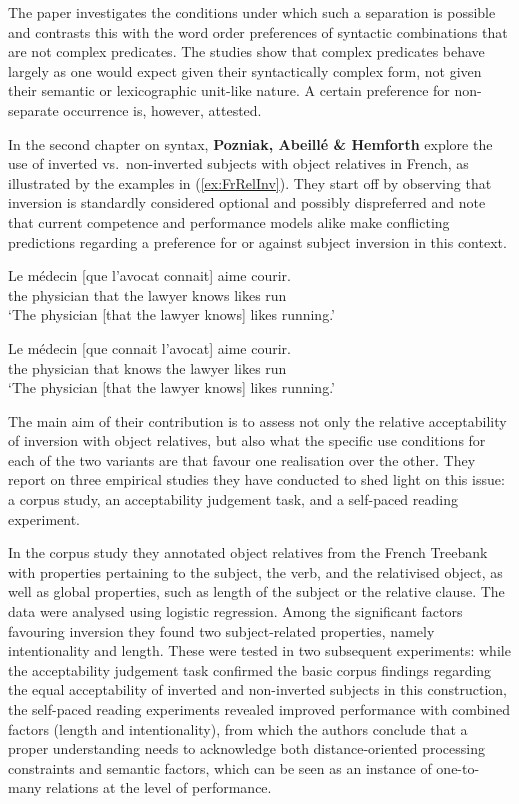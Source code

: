 \documentclass[output=paper]{langscibook}
\begin{document}
The paper investigates the conditions under which such a
separation is possible and contrasts this with the word order
preferences of syntactic combinations that are not complex
predicates. The studies show that complex predicates behave largely as
one would expect given their syntactically complex form, not given
their semantic or lexicographic unit-like nature. A certain preference
for non-separate occurrence is, however, attested.

\medskip


In the second chapter on syntax, \textbf{Pozniak, Abeillé \& Hemforth}
explore the use of inverted vs.\ non-inverted subjects with object relatives in
French, as illustrated by the examples in (\ref{ex:FrRelInv}). They
start off by observing that inversion is standardly considered
optional and possibly dispreferred and note that current competence
and performance models alike make conflicting predictions regarding a
preference for or against subject inversion in this context.

\begin{exe}
  \ex \label{ex:FrRelInv}
  \begin{xlist}
    \ex \gll Le médecin [que l'avocat connait] aime courir.\\
    the physician that {the lawyer} knows likes run\\
    \glt `The physician [that the lawyer knows] likes running.'

    \ex
    \gll Le médecin [que connait l'avocat] aime courir.\\
    the physician that knows {the lawyer}  likes run\\
    \glt `The physician [that the lawyer knows] likes running.'
  \end{xlist}
\end{exe}


The main aim of their contribution is to assess not only the relative
acceptability of inversion with object relatives, but also what the
specific use conditions for each of the two variants are that favour
one realisation over the other. They report on three empirical studies
they have conducted to shed light on this issue: a corpus study, an
acceptability judgement task, and a self-paced reading experiment.


In the corpus study they annotated object relatives from the French
Treebank with properties pertaining to the subject, the verb, and the
relativised object, as well as global properties, such as length of
the subject or the relative clause. The data were analysed using
logistic regression. Among the significant factors favouring inversion
they found two subject-related properties, namely intentionality and
length. These were tested in two subsequent experiments: while the
acceptability judgement task confirmed the basic corpus findings regarding
the equal acceptability of inverted and non-inverted subjects in this
construction, the self-paced reading experiments revealed improved
performance with combined factors (length and intentionality), from
which the authors conclude that a proper understanding needs to
acknowledge both distance-oriented processing constraints and semantic
factors, which can be seen as an instance of one-to-many relations at the
level of performance.
\end{document}
